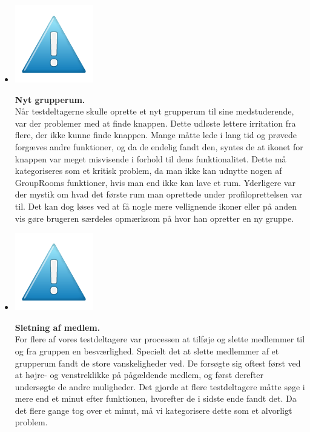 \documentclass[12pt]{article}
\begin{document}
\begin{itemize}
   \item[]       \begin{minipage}{0.07\linewidth}
  \includegraphics[scale=0.3]{Billeder/mindre}
          \end{minipage} \textbf{Nyt grupperum.}\\
Når testdeltagerne skulle oprette et nyt grupperum til sine medstuderende, var der problemer med at finde knappen. Dette udløste lettere irritation fra flere, der ikke kunne finde knappen. Mange måtte lede i lang tid og prøvede forgæves andre funktioner, og da de endelig fandt den, syntes de at ikonet for knappen var meget misvisende i forhold til dens funktionalitet. Dette må kategoriseres som et kritisk problem, da man ikke kan udnytte nogen af GroupRooms funktioner, hvis man end ikke kan lave et rum. Yderligere var der mystik om hvad det første rum man oprettede under profiloprettelsen var til. Det kan dog løses ved at få nogle mere vellignende ikoner eller på anden vis gøre brugeren særdeles opmærksom på hvor han opretter en ny gruppe.
  
   \item[]       \begin{minipage}{0.07\linewidth}
  \includegraphics[scale=0.3]{Billeder/mindre}
          \end{minipage} \textbf{Sletning af medlem.}\\ For flere af vores testdeltagere var processen at tilføje og slette medlemmer til og fra gruppen en besværlighed. Specielt det at slette medlemmer af et grupperum fandt de store vanskeligheder ved. De forsøgte sig oftest først ved at højre- og venstreklikke på pågældende medlem, og først derefter undersøgte de andre muligheder. Det gjorde at flere testdeltagere måtte søge i mere end et minut efter funktionen, hvorefter de i sidste ende fandt det. Da det flere gange tog over et minut, må vi kategorisere dette som et alvorligt problem.
  

\end{itemize}
\end{document}
